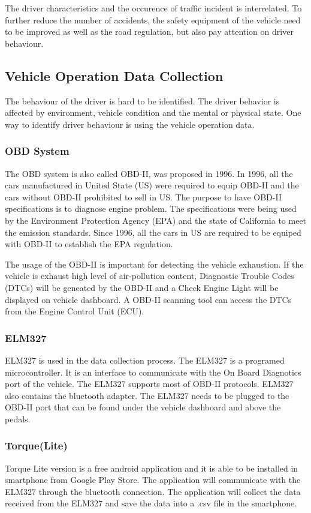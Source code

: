 The driver characteristics and the occurence of traffic incident is interrelated. To further reduce the number of accidents, the safety equipment of the vehicle need to be improved as well as the road regulation, but also pay attention on driver behaviour. 

\subsection{Vehicle Operation Data Collection}
The behaviour of the driver is hard to be identified. The driver behavior is affected by environment, vehicle condition and the mental or physical state. One way to identify driver behaviour is using the vehicle operation data.

\subsubsection{OBD System}
The OBD system is also called OBD-II, was proposed in 1996. In 1996, all the cars manufactured in United State (US) were required to equip OBD-II and the cars without OBD-II prohibited to sell in US. The purpose to have OBD-II specifications is to diagnose engine problem. The specifications were being used by the Environment Protection Agency (EPA) and the state of California to meet the emission standards. Since 1996, all the cars in US are required to be equiped with OBD-II to establish the EPA regulation. 

The usage of the OBD-II is important for detecting the vehicle exhaustion. If the vehicle is exhaust high level of air-pollution content, Diagnostic Trouble Codes (DTCs) will be geneated by the OBD-II and a Check Engine Light will be displayed on vehicle dashboard. A OBD-II scanning tool can access the DTCs from the Engine Control Unit (ECU). 

\subsubsection{ELM327}
ELM327 is used in the data collection process. The ELM327 is a programed microcontroller. It is an interface to communicate with the On Board Diagnotics port of the vehicle. The ELM327 supports most of OBD-II protocols. ELM327 also contains the bluetooth adapter. The ELM327 needs to be plugged to the OBD-II port that can be found under the vehicle dashboard and above the pedals. 

\subsubsection{Torque(Lite)}
Torque Lite version is a free android application and it is able to be installed in smartphone from Google Play Store. The application will communicate with the ELM327 through the bluetooth connection. The application will collect the data received from the ELM327 and  save the data into a .csv file in the smartphone. 

